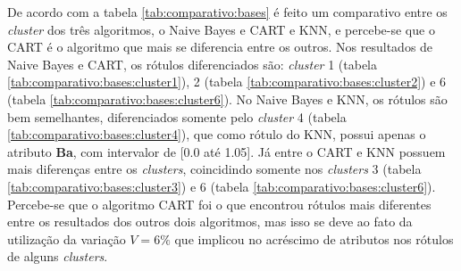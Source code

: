 \begin{table}[!h]
%         
   \hspace{1cm}    

\label{tab:comparativo:bases}
\end{table}


De acordo com a tabela \ref{tab:comparativo:bases} é feito um comparativo entre os \textit{cluster} dos três algoritmos,  o Naive Bayes e CART e KNN, e percebe-se que o CART é o algoritmo que mais se diferencia entre os outros. Nos resultados de Naive Bayes e CART, os rótulos diferenciados são: \textit{cluster} 1 (tabela \ref{tab:comparativo:bases:cluster1}), 2 (tabela \ref{tab:comparativo:bases:cluster2}) e 6 (tabela \ref{tab:comparativo:bases:cluster6}). No  Naive Bayes e KNN, os rótulos são bem semelhantes, diferenciados somente pelo \textit{cluster} 4 (tabela \ref{tab:comparativo:bases:cluster4}), que como rótulo do KNN, possui apenas o atributo \textbf{Ba}, com intervalor de [0.0 até 1.05]. Já entre o CART e KNN possuem mais diferenças entre os \textit{clusters}, coincidindo somente nos \textit{clusters} 3 (tabela \ref{tab:comparativo:bases:cluster3}) e 6 (tabela \ref{tab:comparativo:bases:cluster6}). Percebe-se que o algoritmo CART foi o que encontrou rótulos mais diferentes entre os resultados dos outros dois algoritmos, mas isso se deve ao fato da utilização da variação ${V=6\%}$ que implicou no acréscimo de  atributos nos rótulos de alguns \textit{clusters}.

